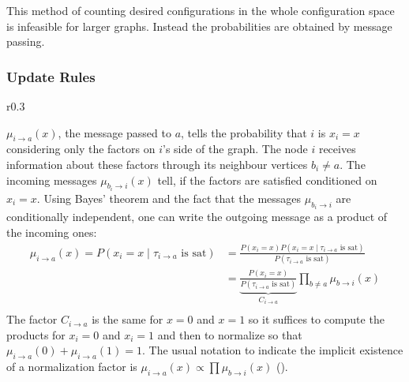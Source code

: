 This method of counting desired configurations in the whole configuration space is infeasible for larger graphs. Instead the probabilities are obtained by message passing.

\subsubsection{Update Rules}


\begin{wrapfigure}{r}{0.3\textwidth}

\end{wrapfigure}
$\mu_{i \rightarrow a}(x)$, the message passed to $a$, tells the probability that $i$ is $x_i = x$ considering only the factors on $i$'s side of the graph. \newline The node $i$ receives information about these factors through its neighbour vertices $b_i \neq a$. The incoming messages $\mu_{b_i \rightarrow i}(x)$ tell, if the factors are satisfied conditioned on $x_i = x$. \newline
Using Bayes' theorem and the fact that the messages $\mu_{b_i \rightarrow i}$ are conditionally independent, one can write the outgoing message  as a product of the incoming ones:
\begin{align*}
\mu_{i\rightarrow a}(x) = P(x_i = x \; | \; \tau_{i \rightarrow a} \text{ is sat})
&= \frac{P(x_i = x) P(x_i = x \; | \; \tau_{i \rightarrow a} \text{ is sat})}{P(\tau_{i \rightarrow a} \text{ is sat})} \\
&= \underbrace{\frac{P(x_i = x)}{P(\tau_{i \rightarrow a}\text{ is sat})}}_{C_{i \rightarrow a}} \prod_{b \neq a} \mu_{b \rightarrow i}(x) \\
\end{align*}
The factor $C_{i \rightarrow a}$ is the same for $x=0$ and $x=1$ so it suffices to compute the products for $x_i = 0$ and $x_i = 1$ and then to normalize so that $\mu_{i\rightarrow a}(0) + \mu_{i \rightarrow a}(1) = 1$. The usual notation to indicate the implicit existence of a normalization factor is $\mu_{i \rightarrow a}(x) \propto \prod \mu_{b \rightarrow i}(x)$ (\cite{lecture}). 


